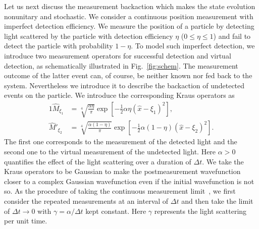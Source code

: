 \documentclass[aps,pra,superscriptaddress,twocolumn
]{revtex4-2}
\begin{document}
 Let us next discuss the measurement backaction which makes the state evolution nonunitary and stochastic.
 We consider a continuous position measurement with imperfect detection efficiency. 
 We measure the position of a particle by detecting light scattered by the particle 
 with detection efficiency $\eta$ ($0\leqslant \eta \leqslant 1$) and
 fail to detect the particle with probability $1-\eta$.
 To model such imperfect detection, we introduce two measurement operators 
 for successful detection and virtual detection, as  schematically illustrated in Fig.~\ref{fig:schem}.
 The measurement outcome of the latter event can, of course, be neither known nor fed back to the system.
 Nevertheless we introduce it to describe the backaction of undetected events on the particle.
 We introduce the corresponding Kraus operators as 
 \begin{alignat}{1}
  \hat M_{\xi_1} &= \sqrt[4]{\frac{\alpha\eta}{\pi}}\exp\left[-\frac{1}{2}\alpha\eta (\hat x - \xi_1)^2\right], \label{Krausop1} \\
  \hat M'_{\xi_2} &= \sqrt[4]{\frac{\alpha(1-\eta)}{\pi}}\exp\left[-\frac{1}{2}\alpha(1-\eta) (\hat x - \xi_2)^2\right].\label{Krausop2}
 \end{alignat}
 The first one corresponds to the measurement of the detected light and 
 the second one to the virtual measurement of the undetected light.
 {Here $\alpha > 0$ quantifies the effect of the light scattering 
 over a duration of $\Delta t$.}
 We take the Kraus operators to be Gaussian 
 to make the postmeasurement wavefunction closer to a complex Gaussian wavefunction 
 even if the initial wavefunction is not so.
 As the procedure of taking the continuous measurement limit~\cite{Di_si_1988}, 
 we first consider the repeated measurements at an interval of $\Delta t$ 
 and then take the limit of $\Delta t\to 0$ with $\gamma = \alpha / \Delta t$ kept constant.
 {Here $\gamma$ represents the light scattering per unit time.}
 
\end{document}
